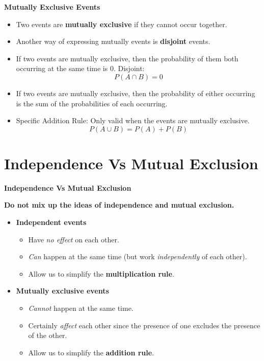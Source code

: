 \documentclass[]{report}
\begin{document}

\noindent \textbf{Mutually Exclusive Events}

\begin{itemize}
\item Two events are \textbf{mutually exclusive} if they cannot occur together. 
\item Another way of expressing mutually events is \textbf{disjoint} events.
\item If two events are mutually exclusive, then the probability of them both occurring at the same time is 0.
Disjoint:  \[P(A \cap B) = 0\]
\end{itemize}


\begin{itemize}
\item If two events are mutually exclusive, then the probability of either occurring is the sum of the probabilities of each occurring.
\item Specific Addition Rule: Only valid when the events are mutually exclusive.
\[P(A \cup B) = P(A) + P(B)\]
\end{itemize}   


\section{Independence Vs Mutual Exclusion}
{\bf \textbf{Independence Vs Mutual Exclusion}}

{\bf Do not mix up the ideas of independence and mutual exclusion.\\[0.3cm]}
\begin{itemize}\itemsep0.3cm
\item {\bf Independent events}
\begin{itemize}\itemsep0.2cm
\item Have \emph{no effect} on each other.
\item \emph{Can} happen at the same time (but work \emph{independently} of each other).
\item Allow us to simplify the {\bf multiplication rule}.
\end{itemize}
\item {\bf Mutually exclusive events}
\begin{itemize}\itemsep0.2cm
\item \emph{Cannot} happen at the same time.
\item Certainly \emph{affect} each other since the presence of one excludes the presence of the other.
\item Allow us to simplify the {\bf addition rule}.
\end{itemize}
\end{itemize}
\end{document}

